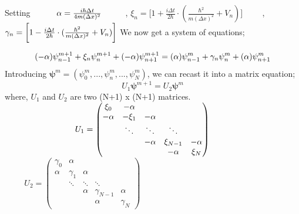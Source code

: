\documentclass{article}
\begin{document}
Setting $ \hspace{1 cm} \alpha = \frac{i\hbar \Delta t}{4m(\Delta x)^2} \hspace{1 cm} $, $\xi_n=\bigg[ 1 + \frac{i\Delta t}{2\hbar}\cdot (\frac{\hbar^2}{m(\Delta x)^2}+V_n)\bigg] \hspace{1cm}$, $\gamma_n=\bigg[ 1 - \frac{i\Delta t}{2\hbar}\cdot (\frac{\hbar^2}{m(\Delta x)^2}+V_n)\bigg]\\ \\ \\ \\ $ We now get a system of equations;

$$
(-\alpha)\psi_{n-1}^{m+1} + \xi_{n}\psi_n^{m+1} + (-\alpha)\psi_{n+1}^{m+1} = (\alpha)\psi_{n-1}^{m} + \gamma_{n}\psi_n^{m} + (\alpha)\psi_{n+1}^{m} \vspace{0.2cm}$$
Introducing $\pmb{\psi}^m = (\psi_0^{m}, ...,\psi_n^m, ...,\psi_N^m)$, we can recast it into a matrix equation; 
$$U_1\pmb{\psi}^{m+1} = U_2\pmb{\psi}^m$$
where, $U_1$ and $U_2$ are two (N+1) x (N+1) matrices.
$\\ \\  
\hspace{3cm} U_1=\begin{pmatrix}
    \xi_0 & -\alpha &           &      &  \\
  -\alpha & -\xi_1  & -\alpha   &      &   \\
          &  \ddots &  \ddots      & \ddots    &     \\
          &         &    -\alpha       &  \xi_{N-1}     & -\alpha \\
          &         &           &  -\alpha  & \xi_N
  \end{pmatrix}
$
$ \hspace{1cm}
U_2 =\begin{pmatrix}
     \gamma_0 & \alpha &         &             &  \\
      \alpha & \gamma_1& \alpha  &             &   \\
             &  \ddots &  \ddots & \ddots      &     \\
             &         & \alpha  & \gamma_{N-1}& \alpha \\
             &         &         &  \alpha     & \gamma_N
  \end{pmatrix}
$
\\
\\
\end{document}
